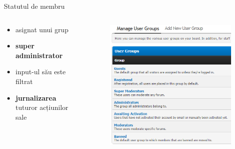 \documentclass[9pt]{beamer}
\begin{document}
\begin{frame}{Statutul de membru}
  \begin{columns}
    \begin{column}[c]{0.50\textwidth}
        \begin{itemize}
		\vskip10pt
		\item asignat unui grup
		\vskip10pt
		\item \textbf{super administrator}
		\vskip10pt
		\item input-ul său este filtrat
		\vskip10pt
		\item \textbf{jurnalizarea} tuturor acțiunilor sale
	    \end{itemize}
    \end{column}
    \begin{column}[c]{0.50\textwidth}
      \begin{figure}
        \includegraphics[scale=0.4]{figures/screen4}
      \end{figure}
    \end{column}
  \end{columns}
\end{frame}
\end{document}
